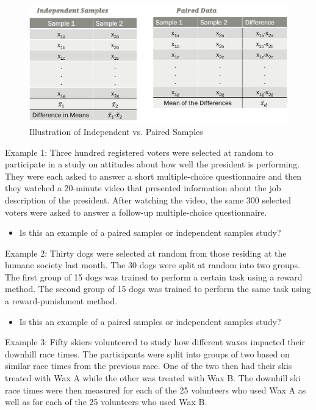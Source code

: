 \documentclass[
]{report}
\providecommand{\tightlist}{%
  \setlength{\itemsep}{0pt}\setlength{\parskip}{0pt}}
\begin{document}
\begin{figure}

{\centering \includegraphics[width=0.6\linewidth]{images/paired_independent} 

}

\caption{Illustration of Independent vs. Paired Samples}\label{fig:pairedindependent}
\end{figure}

Example 1: Three hundred registered voters were selected at random to participate in a study on attitudes about how well the president is performing. They were each asked to answer a short multiple-choice questionnaire and then they watched a 20-minute video that presented information about the job description of the president. After watching the video, the same 300 selected voters were asked to answer a follow-up multiple-choice questionnaire.

\begin{itemize}
\tightlist
\item
  Is this an example of a paired samples or independent samples study?
\end{itemize}

\vspace{0.3in}

\newpage

Example 2: Thirty dogs were selected at random from those residing at the humane society last month. The 30 dogs were split at random into two groups. The first group of 15 dogs was trained to perform a certain task using a reward method. The second group of 15 dogs was trained to perform the same task using a reward-punishment method.

\begin{itemize}
\tightlist
\item
  Is this an example of a paired samples or independent samples study?
\end{itemize}

\vspace{0.3in}

Example 3: Fifty skiers volunteered to study how different waxes impacted their downhill race times. The participants were split into groups of two based on similar race times from the previous race. One of the two then had their skis treated with Wax A while the other was treated with Wax B. The downhill ski race times were then measured for each of the 25 volunteers who used Wax A as well as for each of the 25 volunteers who used Wax B.
\end{document}
